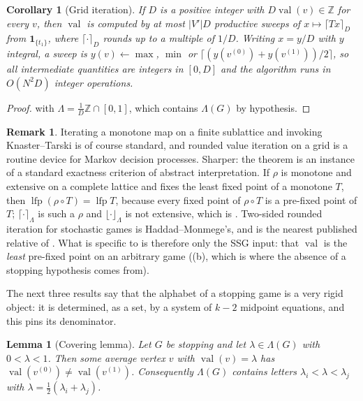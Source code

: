 \documentclass[11pt]{article}
\theoremstyle{plain}
\newtheorem{lemma}[theorem]{Lemma}
\newtheorem{corollary}[theorem]{Corollary}
\theoremstyle{definition}
\newtheorem{remark}[theorem]{Remark}
\DeclareMathOperator{\val}{val}
\DeclareMathOperator{\lfp}{lfp}
\newcommand{\bbone}{\mathbf{1}}
\begin{document}
\begin{corollary}[Grid iteration]\label{cor:grid-iteration}
If $D$ is a positive integer with $D\val(v)\in\mathbb Z$ for every $v$,
then $\val$ is computed by at most $|V'|D$ productive sweeps of
$x\mapsto\lceil Tx\rceil_{D}$ from $\bbone_{\{t_1\}}$, where
$\lceil\cdot\rceil_D$ rounds up to a multiple of $1/D$. Writing
$x=y/D$ with $y$ integral, a sweep is
$y(v)\leftarrow\max$, $\min$ or $\lceil (y(v^{(0)})+y(v^{(1)}))/2\rceil$,
so all intermediate quantities are integers in $[0,D]$ and the algorithm
runs in $O(N^{2}D)$ integer operations.
\end{corollary}

\begin{proof}
 with $\Lambda=\tfrac1D\mathbb Z\cap[0,1]$,
which contains $\Lambda(G)$ by hypothesis.
\end{proof}

\begin{remark}
Iterating a monotone map on a finite sublattice and invoking
Knaster--Tarski is of course standard, and rounded value iteration on a
grid is a routine device for Markov decision processes. Sharper: the theorem is an instance of a standard exactness criterion of
abstract interpretation. If $\rho$ is monotone and extensive on a complete
lattice and fixes the least fixed point of a monotone $T$, then
$\lfp(\rho\circ T)=\lfp T$, because every fixed point of $\rho\circ T$ is a
pre-fixed point of $T$; $\lceil\cdot\rceil_\Lambda$ is such a $\rho$ and
$\lfloor\cdot\rfloor_\Lambda$ is not extensive, which is
. Two-sided rounded iteration for stochastic games
is Haddad--Monmege's, and is the nearest published relative of
. What is specific
to  is therefore only the SSG input: that
$\val$ is the \emph{least} pre-fixed point on an arbitrary game
((b), which is where the absence of a stopping
hypothesis comes from).
\end{remark}

\medskip
The next three results say that the alphabet of a stopping game is a very
rigid object: it is determined, as a set, by a system of $k-2$ midpoint
equations, and this pins its denominator.

\begin{lemma}[Covering lemma]\label{lem:alphabet-cover}
Let $G$ be stopping and let $\lambda\in\Lambda(G)$ with $0<\lambda<1$.
Then some average vertex $v$ with $\val(v)=\lambda$ has
$\val(v^{(0)})\ne\val(v^{(1)})$. Consequently $\Lambda(G)$ contains
letters $\lambda_i<\lambda<\lambda_j$ with
$\lambda=\tfrac12(\lambda_i+\lambda_j)$.
\end{lemma}
\end{document}
